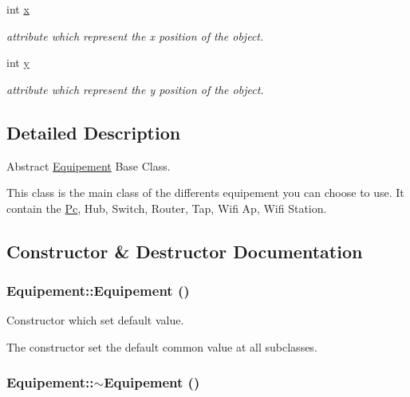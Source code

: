 \begin{CompactItemize}
int \hyperlink{class_equipement_45ae2acbe57b1a47e7e9eeed67738109}{x}
\begin{CompactList}\small\item\em attribute which represent the x position of the object. \item\end{CompactList}\item 
int \hyperlink{class_equipement_de92f12b5da5dde6f2b43921789cf676}{y}
\begin{CompactList}\small\item\em attribute which represent the y position of the object. \item\end{CompactList}\end{CompactItemize}


\subsection{Detailed Description}
Abstract \hyperlink{class_equipement}{Equipement} Base Class. 

This class is the main class of the differents equipement you can choose to use. It contain the \hyperlink{class_pc}{Pc}, Hub, Switch, Router, Tap, Wifi Ap, Wifi Station. 

\subsection{Constructor \& Destructor Documentation}
\hypertarget{class_equipement_9057a4777d006cbac4c72d09a8d09407}{
\subsubsection[{Equipement}]{\setlength{\rightskip}{0pt plus 5cm}Equipement::Equipement ()}}
\label{class_equipement_9057a4777d006cbac4c72d09a8d09407}


Constructor which set default value. 

The constructor set the default common value at all subclasses. \hypertarget{class_equipement_e7751a52f2665d9e4b3e2cd6929bd986}{
\subsubsection[{$\sim$Equipement}]{\setlength{\rightskip}{0pt plus 5cm}Equipement::$\sim$Equipement ()}}
\label{class_equipement_e7751a52f2665d9e4b3e2cd6929bd986}


